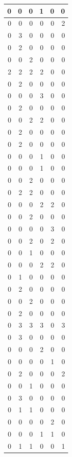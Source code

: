 \documentclass[
  12pt,
]{krantz}
\begin{document}
\begin{tabular}{r|r|r|r|r|r}
\hline
0 & 0 & 0 & 1 & 0 & 0\\
\hline
0 & 0 & 0 & 0 & 0 & 2\\
\hline
0 & 3 & 0 & 0 & 0 & 0\\
\hline
0 & 2 & 0 & 0 & 0 & 0\\
\hline
0 & 0 & 2 & 0 & 0 & 0\\
\hline
2 & 2 & 2 & 2 & 0 & 0\\
\hline
0 & 2 & 0 & 0 & 0 & 0\\
\hline
0 & 0 & 0 & 3 & 0 & 0\\
\hline
0 & 2 & 0 & 0 & 0 & 0\\
\hline
0 & 0 & 2 & 2 & 0 & 0\\
\hline
0 & 2 & 0 & 0 & 0 & 0\\
\hline
0 & 2 & 0 & 0 & 0 & 0\\
\hline
0 & 0 & 0 & 1 & 0 & 0\\
\hline
0 & 0 & 0 & 1 & 0 & 0\\
\hline
0 & 0 & 2 & 0 & 0 & 0\\
\hline
0 & 2 & 2 & 0 & 0 & 0\\
\hline
0 & 0 & 0 & 2 & 2 & 0\\
\hline
0 & 0 & 2 & 0 & 0 & 0\\
\hline
0 & 0 & 0 & 0 & 3 & 0\\
\hline
0 & 0 & 2 & 0 & 2 & 0\\
\hline
0 & 0 & 1 & 0 & 0 & 0\\
\hline
0 & 0 & 0 & 2 & 2 & 0\\
\hline
0 & 1 & 0 & 0 & 0 & 0\\
\hline
0 & 2 & 0 & 0 & 0 & 0\\
\hline
0 & 0 & 2 & 0 & 0 & 0\\
\hline
0 & 2 & 0 & 0 & 0 & 0\\
\hline
0 & 3 & 3 & 3 & 0 & 3\\
\hline
0 & 3 & 0 & 0 & 0 & 0\\
\hline
0 & 0 & 0 & 2 & 0 & 0\\
\hline
0 & 0 & 0 & 0 & 1 & 0\\
\hline
0 & 2 & 0 & 0 & 0 & 2\\
\hline
0 & 0 & 1 & 0 & 0 & 0\\
\hline
0 & 3 & 0 & 0 & 0 & 0\\
\hline
0 & 1 & 1 & 0 & 0 & 0\\
\hline
0 & 0 & 0 & 0 & 2 & 0\\
\hline
0 & 0 & 0 & 1 & 1 & 0\\
\hline
0 & 1 & 1 & 0 & 0 & 1\\

\end{tabular}
\end{document}
